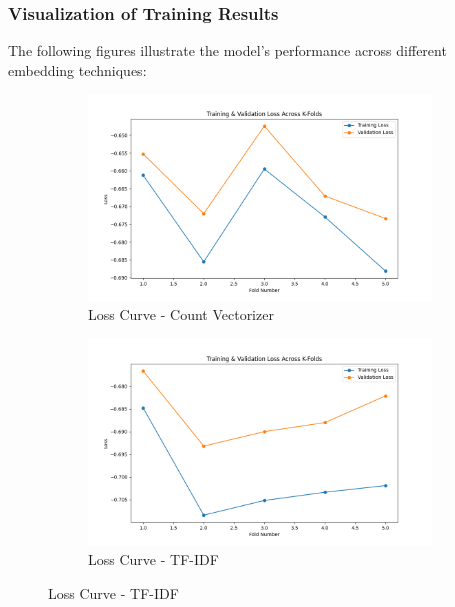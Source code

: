 \subsubsection{Visualization of Training Results}

The following figures illustrate the model’s performance across different embedding techniques:

\begin{figure}[H]
    \centering
    \begin{subfigure}[b]{0.40\textwidth}
        \includegraphics[width=\textwidth]{img/report_info/img/2.1.Perceptron/best_perceptron_count_loss.png}
        \caption{Loss Curve - Count Vectorizer}
        \label{fig:perc-count-loss}
    \end{subfigure}
    \begin{subfigure}[b]{0.40\textwidth}
        \includegraphics[width=\textwidth]{img/report_info/img/2.1.Perceptron/best_perceptron_tfidf_loss.png}
        \caption{Loss Curve - TF-IDF}
        \label{fig:perc-tfidf-loss}
    \end{subfigure}
    

\end{figure}
